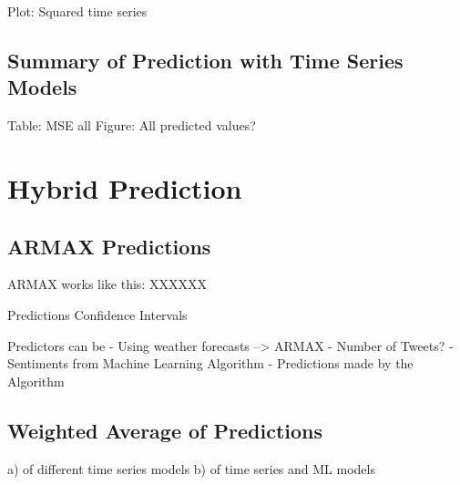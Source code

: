 Plot: Squared time series



\subsection{Summary of Prediction with Time Series Models}
Table: MSE all
Figure: All predicted values?


\section{Hybrid Prediction}

\subsection{ARMAX Predictions}
ARMAX works like this: 
XXXXXX

Predictions
Confidence Intervals


Predictors can be 
- Using weather forecasts --> ARMAX
- Number of Tweets?
- Sentiments from Machine Learning Algorithm
- Predictions made by the Algorithm



\subsection{Weighted Average of Predictions}
a) of different time series models
b) of time series and ML models